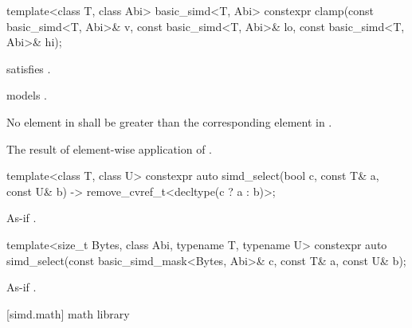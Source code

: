 \begin{itemdecl}
template<class T, class Abi> basic_simd<T, Abi>
  constexpr clamp(const basic_simd<T, Abi>& v, const basic_simd<T, Abi>& lo, const basic_simd<T, Abi>& hi);
\end{itemdecl}

\begin{itemdescr}
  \pnum\constraints
   satisfies .

  \pnum\expects
   models .

  \pnum\expects
  No element in  shall be greater than the corresponding element in .

  \pnum\returns
  The result of element-wise application of  \foralli.
\end{itemdescr}

\begin{itemdecl}
  template<class T, class U>
    constexpr auto simd_select(bool c, const T& a, const U& b) -> remove_cvref_t<decltype(c ? a : b)>;
\end{itemdecl}

\begin{itemdescr}
    \pnum\returns As-if .
\end{itemdescr}

\begin{itemdecl}
  template<size_t Bytes, class Abi, typename T, typename U>
    constexpr auto simd_select(const basic_simd_mask<Bytes, Abi>& c, const T& a, const U& b);
\end{itemdecl}

\begin{itemdescr}
    \pnum\returns As-if .
\end{itemdescr}

[simd.math]{ math library}


